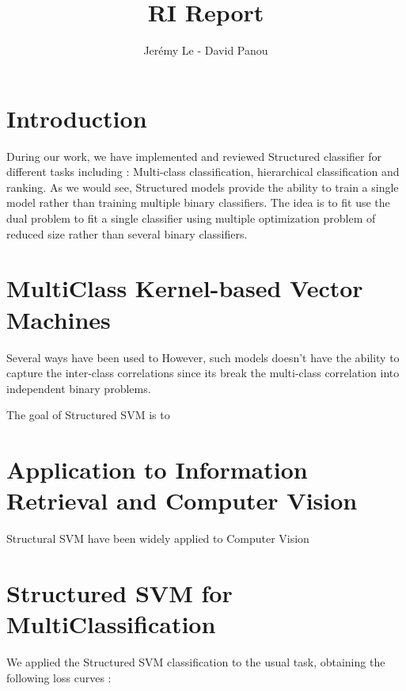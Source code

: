\documentclass[a4paper,10pt]{article}
\title{RI Report}
\author{Jerémy Le - David Panou}
\begin{document}
\maketitle
\section{Introduction}

During our work, we have implemented and reviewed Structured classifier for different tasks including : Multi-class classification, hierarchical classification and ranking. As we would see, Structured models provide the ability to train a single model rather than training multiple binary classifiers.
The idea is to fit use the dual problem to fit a single classifier using multiple optimization problem of reduced size rather than several binary classifiers.

\section{MultiClass Kernel-based Vector Machines}

Several ways have been used to 
However, such models doesn't have the ability to capture the inter-class correlations since its break the multi-class correlation into independent binary problems.

The goal of Structured SVM is to

\section{Application to Information Retrieval and Computer Vision}

Structural SVM have been widely applied to Computer Vision 

\section{Structured SVM for MultiClassification}

We applied the Structured SVM classification to the usual task, obtaining the following loss curves : 
\end{document}
